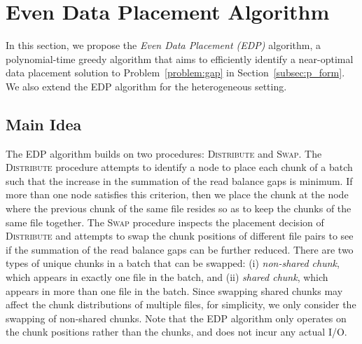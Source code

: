 \section{Even Data Placement Algorithm}
\label{sec:algorithm}

In this section, we propose the {\em Even Data Placement (EDP)} algorithm, a
polynomial-time greedy algorithm that aims to efficiently identify a
near-optimal data placement solution to Problem~\ref{problem:gap} in
Section~\ref{subsec:p_form}.  We also extend the EDP algorithm for the
heterogeneous setting. 

\subsection{Main Idea}


The EDP algorithm builds on two procedures: \textsc{Distribute} and
\textsc{Swap}.  The \textsc{Distribute} procedure attempts to identify a node
to place each chunk of a batch such that the increase in the summation of the
read balance gaps is minimum.  If more than one node satisfies this criterion,
then we place the chunk at the node where the previous chunk of the same file
resides so as to keep the chunks of the same file together.  The \textsc{Swap}
procedure inspects the placement decision of \textsc{Distribute} and attempts
to swap the chunk positions of different file pairs to see if the summation of
the read balance gaps can be further reduced.  There are two types of unique
chunks in a batch that can be swapped: (i) {\em non-shared chunk}, which
appears in exactly one file in the batch, and (ii) {\em shared chunk}, which
appears in more than one file in the batch.  Since swapping shared chunks may
affect the chunk distributions of multiple files, for simplicity, we only
consider the swapping of non-shared chunks.  Note that the EDP algorithm only
operates on the chunk positions rather than the chunks, and does not incur any
actual I/O.   


